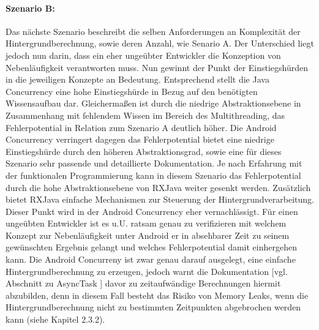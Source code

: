 \documentclass[12pt,oneside,a4paper,bibtotoc,liststotoc]{scrreprt}
\begin{document}
\paragraph{Szenario B:}
Das nächste Szenario beschreibt die selben Anforderungen an Komplexität der Hintergrundberechnung, sowie deren Anzahl, wie Senario A. Der Unterschied liegt jedoch nun darin, dass ein eher ungeübter Entwickler die Konzeption von Nebenläufigkeit verantworten muss. Nun gewinnt der Punkt der Einstiegshürden in die jeweiligen Konzepte an Bedeutung. Entsprechend stellt die Java Concurrency eine hohe Einstiegshürde in Bezug auf den benötigten Wissensaufbau dar. Gleichermaßen ist durch die niedrige Abstraktionsebene in Zusammenhang mit fehlendem Wissen im Bereich des Multithreading, das Fehlerpotential in Relation zum Szenario A deutlich höher.
Die Android Concurrency verringert dagegen das Fehlerpotential bietet eine niedrige Einstiegshürde durch den höheren Abstraktionsgrad, sowie eine für dieses Szenario sehr passende und detaillierte Dokumentation.
Je nach Erfahrung mit der funktionalen Programmierung kann in diesem Szenario das Fehlerpotential durch die hohe Abstraktionsebene von RXJava weiter gesenkt werden. Zusätzlich bietet RXJava einfache Mechanismen zur Steuerung der Hintergrundverarbeitung. Dieser Punkt wird in der Android Concurrency eher vernachlässigt.
Für einen ungeübten Entwickler ist es u.U. ratsam genau zu verifizieren mit welchem Konzept zur Nebenläufigkeit unter Android er in absehbarer Zeit zu seinem gewünschten Ergebnis gelangt und welches Fehlerpotential damit einhergehen kann. Die Android Concurreny ist zwar genau darauf ausgelegt, eine einfache Hintergrundberechnung zu erzeugen, jedoch warnt die Dokumentation [vgl. Abschnitt zu AsyncTask \citet{androidDevDocu}] davor zu zeitaufwändige Berechnungen hiermit abzubilden, denn in diesem Fall besteht das Risiko von Memory Leaks, wenn die Hintergrundberechnung nicht zu bestimmten Zeitpunkten abgebrochen werden kann (siehe Kapitel 2.3.2).
\end{document}
